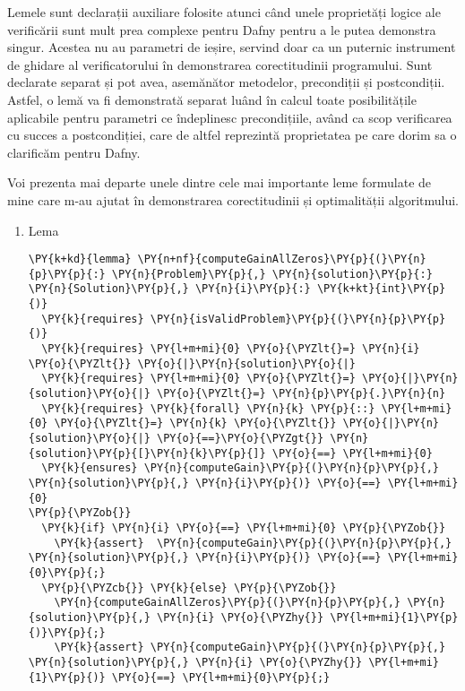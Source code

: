 \begin{sloppypar}
Lemele sunt declarații auxiliare folosite atunci când unele proprietăți logice ale verificării sunt mult prea complexe pentru Dafny pentru a le putea demonstra singur. Acestea nu au parametri de ieșire, servind doar ca un puternic instrument de ghidare al verificatorului în demonstrarea corectitudinii programului. Sunt declarate separat și pot avea, asemănător metodelor, precondiții și postcondiții. Astfel, o lemă va fi demonstrată separat luând în calcul toate posibilitățile aplicabile pentru parametri ce îndeplinesc precondițiile, având ca scop verificarea cu succes a postcondiției, care de altfel reprezintă proprietatea pe care dorim sa o clarificăm pentru Dafny. \par
Voi prezenta mai departe unele dintre cele mai importante leme formulate de mine care m-au ajutat în demonstrarea corectitudinii și optimalității algoritmului. \par
\begin{enumerate}
    \item Lema  
    \begin{Verbatim}[commandchars=\\\{\}]
\PY{k+kd}{lemma} \PY{n+nf}{computeGainAllZeros}\PY{p}{(}\PY{n}{p}\PY{p}{:} \PY{n}{Problem}\PY{p}{,} \PY{n}{solution}\PY{p}{:} \PY{n}{Solution}\PY{p}{,} \PY{n}{i}\PY{p}{:} \PY{k+kt}{int}\PY{p}{)}
  \PY{k}{requires} \PY{n}{isValidProblem}\PY{p}{(}\PY{n}{p}\PY{p}{)}
  \PY{k}{requires} \PY{l+m+mi}{0} \PY{o}{\PYZlt{}=} \PY{n}{i} \PY{o}{\PYZlt{}} \PY{o}{|}\PY{n}{solution}\PY{o}{|}
  \PY{k}{requires} \PY{l+m+mi}{0} \PY{o}{\PYZlt{}=} \PY{o}{|}\PY{n}{solution}\PY{o}{|} \PY{o}{\PYZlt{}=} \PY{n}{p}\PY{p}{.}\PY{n}{n} 
  \PY{k}{requires} \PY{k}{forall} \PY{n}{k} \PY{p}{::} \PY{l+m+mi}{0} \PY{o}{\PYZlt{}=} \PY{n}{k} \PY{o}{\PYZlt{}} \PY{o}{|}\PY{n}{solution}\PY{o}{|} \PY{o}{==}\PY{o}{\PYZgt{}} \PY{n}{solution}\PY{p}{[}\PY{n}{k}\PY{p}{]} \PY{o}{==} \PY{l+m+mi}{0}
  \PY{k}{ensures} \PY{n}{computeGain}\PY{p}{(}\PY{n}{p}\PY{p}{,} \PY{n}{solution}\PY{p}{,} \PY{n}{i}\PY{p}{)} \PY{o}{==} \PY{l+m+mi}{0}
\PY{p}{\PYZob{}}
  \PY{k}{if} \PY{n}{i} \PY{o}{==} \PY{l+m+mi}{0} \PY{p}{\PYZob{}}
    \PY{k}{assert}  \PY{n}{computeGain}\PY{p}{(}\PY{n}{p}\PY{p}{,} \PY{n}{solution}\PY{p}{,} \PY{n}{i}\PY{p}{)} \PY{o}{==} \PY{l+m+mi}{0}\PY{p}{;}
  \PY{p}{\PYZcb{}} \PY{k}{else} \PY{p}{\PYZob{}}
    \PY{n}{computeGainAllZeros}\PY{p}{(}\PY{n}{p}\PY{p}{,} \PY{n}{solution}\PY{p}{,} \PY{n}{i} \PY{o}{\PYZhy{}} \PY{l+m+mi}{1}\PY{p}{)}\PY{p}{;}
    \PY{k}{assert} \PY{n}{computeGain}\PY{p}{(}\PY{n}{p}\PY{p}{,} \PY{n}{solution}\PY{p}{,} \PY{n}{i} \PY{o}{\PYZhy{}} \PY{l+m+mi}{1}\PY{p}{)} \PY{o}{==} \PY{l+m+mi}{0}\PY{p}{;}

\end{Verbatim}
\end{enumerate}
\end{sloppypar}
